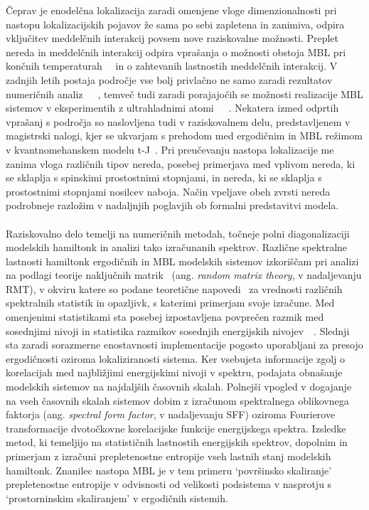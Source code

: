  Čeprav je enodelčna lokalizacija zaradi omenjene  vloge dimenzionalnosti pri nastopu lokalizacijskih pojavov že sama po sebi zapletena in zanimiva, odpira vključitev meddelčnih interakcij povsem nove raziskovalne možnosti. Preplet nereda in meddelčnih interakcij odpira vprašanja o možnosti obstoja MBL pri končnih temperaturah~\cite{basko2006metal}~\cite{PhysRevB.75.155111} in o zahtevanih lastnostih meddelčnih interakcij. V zadnjih letih postaja področje vse bolj privlačno ne samo zaradi rezultatov numeričnih analiz~\cite{vznidarivc2008many}~\cite{PhysRevB.75.155111}~\cite{PhysRevA.92.041601}, temveč tudi zaradi porajajočih se možnosti realizacije MBL sistemov v eksperimentih z ultrahladnimi atomi~\cite{PhysRevLett.114.083002}~\cite{schreiber2015observation}~\cite{PhysRevLett.116.140401}. Nekatera izmed odprtih vprašanj s področja so naslovljena tudi v raziskovalnem delu, predstavljenem v magistrski nalogi, kjer se ukvarjam s prehodom med ergodičnim in MBL režimom v kvantnomehanskem modelu t-J~\cite{spalek2007tj}. Pri preučevanju nastopa lokalizacije me zanima vloga različnih tipov nereda, posebej primerjava med vplivom nereda, ki se sklaplja s spinskimi prostostnimi stopnjami, in nereda, ki se sklaplja s prostostnimi stopnjami nosilcev naboja. Način vpeljave obeh zvrsti nereda podrobneje razložim v nadaljnjih poglavjih ob formalni predstavitvi modela.
  \\\\Raziskovalno delo temelji na numeričnih metodah, točneje polni diagonalizaciji modelskih hamiltonk in 
  analizi tako izračunanih spektrov.  Različne spektralne lastnosti hamiltonk ergodičnih in MBL modelskih sistemov izkoriščam pri analizi na podlagi teorije naključnih matrik~\cite{d2016quantum} (ang. \emph{random matrix theory}, v nadaljevanju RMT), v okviru katere so podane teoretične napovedi~\cite{mehta2004random} za vrednosti različnih spektralnih statistik in opazljivk, s katerimi primerjam svoje izračune. Med omenjenimi statistikami sta posebej izpostavljena povprečen razmik med sosednjimi nivoji in statistika razmikov sosednjih energijskih nivojev~\cite{Atas_Distribution_PhysRevLett.110.084101}~\cite{PhysRevB.75.155111}. Slednji sta zaradi sorazmerne enostavnosti implementacije pogosto uporabljani za presojo ergodičnosti oziroma lokaliziranosti sistema. Ker vsebujeta informacije zgolj o korelacijah med najbližjimi energijskimi nivoji v spektru, podajata obnašanje modelskih sistemov na najdaljših časovnih skalah. Polnejši vpogled v dogajanje na vseh časovnih skalah sistemov dobim z izračunom spektralnega oblikovnega faktorja (ang. \emph{spectral form factor}, v nadaljevanju SFF) oziroma Fourierove transformacije dvotočkovne korelacijske funkcije energijskega spektra. Izsledke metod, ki temeljijo na statističnih lastnostih energijskih spektrov, dopolnim in primerjam z izračuni prepletenostne entropije vseh lastnih stanj modelskih hamiltonk. Znanilec nastopa MBL je v tem primeru `površinsko skaliranje' prepletenostne entropije v odvisnosti od velikosti podsistema v nasprotju s `prostorninskim skaliranjem' v ergodičnih sistemih. \\\\
